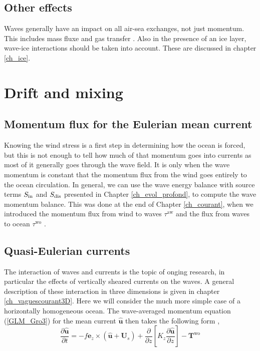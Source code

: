 \subsection{Other effects}
Waves generally have an impact on all air-sea exchanges, not just momentum. This includes mass fluxe \citep[see][ for a recent review of spray generation]{Veron2015} and gas transfer \citep[e.g.][]{Brumer&al.2017b}. Also in the presence of an ice layer, wave-ice interactions should be taken into account. These are discussed in chapter \ref{ch_ice}. 

\section{Drift and mixing}
\subsection{Momentum flux for the Eulerian mean current}
Knowing the wind stress is a first step in determining how the ocean is forced, but this is not enough to tell how much of that momentum goes into currents as most of it generally goes through the wave field. It is only when the wave momentum is constant that the momentum flux from the wind goes entirely to the ocean circulation. In general, we can use the wave energy balance with source terms $S_{\rm in}$ and $S_{\rm dis}$ presented in Chapter \ref{ch_evol_profond}, to compute the wave momentum balance. This was done at the end of Chapter \ref{ch_courant}, when we introduced the momentum flux from wind to waves $\tau^{\mathrm{aw}}$ and the flux from waves to ocean $\tau^{\mathrm{wo}}$ .

\subsection{Quasi-Eulerian currents}
The interaction of waves and currents is the topic of onging research, in particular the effects of vertically sheared currents on the waves. 
A general description of these interaction in three dimensions is given in chapter \ref{ch_vaguescourant3D}. Here 
we will consider the much more simple case of a horizontally homogeneous ocean. The wave-averaged momentum equation  (\ref{GLM_Gro3}) for the mean current $ \widehat{\mathbf u}$
then takes the following form \citep{Hasselmann1970,Xu&Bowen1994}, 
\begin{equation}
 \frac{\partial \widehat{\mathbf u}}{\partial t}
  = 
 - f {\mathbf e}_z \times \left(\widehat{\mathbf u}+{\mathbf U}_{s}\right) + \frac{\partial}{\partial z} \left[{K_z} \frac{\partial
\widehat{\mathbf u} }{\partial z}\right] - {\mathbf T}^{\mathrm{wo}} 
 \label{avgmomz2}
\end{equation}

